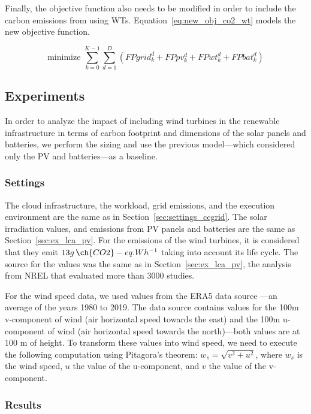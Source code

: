 Finally, the objective function also needs to be modified in order to include the carbon emissions from using WTs. Equation~\ref{eq:new_obj_co2_wt} models the new objective function.

\begin{equation} \label{eq:new_obj_co2_wt}
  \text{minimize }\sum_{k=0}^{K-1} \sum_{d=1}^D (FPgrid^d_k +  FPpv^d_k +  FPwt^d_k + FPbat^d_k) 
\end{equation}

\subsection{Experiments}

In order to analyze the impact of including wind turbines in the renewable infrastructure in terms of carbon footprint and dimensions of the solar panels and batteries, we perform the sizing and use the previous model---which considered only the PV and batteries---as a baseline.

\subsubsection{Settings}
\label{sec:settings_wt}

The cloud infrastructure, the workload, grid emissions, and the execution environment are the same as in Section~\ref{sec:settings_ccgrid}. The solar irradiation values, and emissions from PV panels and batteries are the same as Section~\ref{sec:ex_lca_pv}. For the  emissions of the wind turbines, it is considered that they emit $13 g\,\ch{CO2}-eq.Wh^{-1}$ taking into account its life cycle. The source for the values was the same as in Section~\ref{sec:ex_lca_pv}, the analysis from NREL that evaluated more than 3000 studies.

For the wind speed data, we used values from the ERA5 data source \cite{era5_wind_2022}---an average of the years 1980 to 2019. The data source contains values for the 100m v-component of wind (air horizontal speed towards the east) and the 100m u-component of wind (air horizontal speed towards the north)---both values are at 100 m of height. To transform these values into wind speed, we need to execute the following computation using Pitagora's theorem: $ w_s = \sqrt{ v^2 + u^2} $, where $w_s$ is the wind speed, $u$ the value of the u-component, and $v$ the value of the v-component.
\subsubsection{Results}
\label{sec:results_wt}

